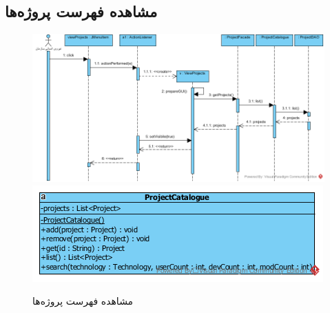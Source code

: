 \begin{landscape}
\section{مشاهده فهرست پروژه‌ها}
\begin{figure}[H]
	\centering
	\includegraphics[scale=0.8]{img/sequence-design/ViewListOfProjects}
	\includegraphics[scale=0.9]{img/sequence-design/ViewListOfProjectsC}
	\caption{مشاهده فهرست پروژه‌ها}
\end{figure}



\end{landscape}
